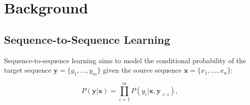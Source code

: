 \section{Background}

\subsection{Sequence-to-Sequence Learning}

Sequence-to-sequence learning aims to model the conditional probability of the target sequence $\mathbf{y} = \{y_1, ..., y_m\}$ given the source sequence $\mathbf{x} = \{x_1, ..., x_n\}$:

\begin{equation}
P(\mathbf{y}|\mathbf{x})=\prod_{i=1}^{m}{P(y_i|\mathbf{x}, \mathbf{y}_{< i})},
\end{equation}


